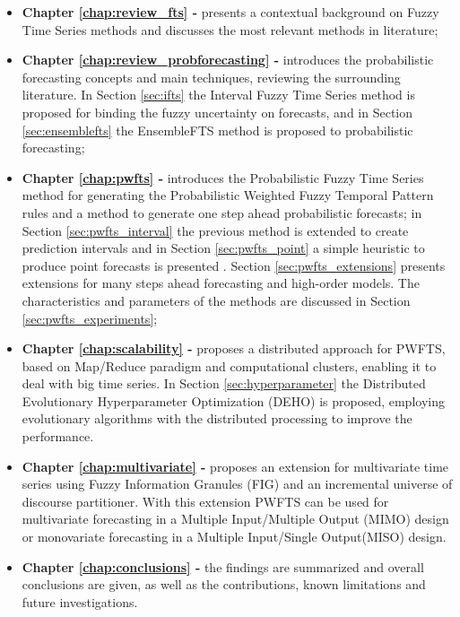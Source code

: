\begin{itemize}
\item \textbf{Chapter \ref{chap:review_fts} -  } presents a contextual background on Fuzzy Time Series methods and discusses the most relevant methods in literature;

\item \textbf{Chapter \ref{chap:review_probforecasting} -  } introduces the probabilistic forecasting concepts and main techniques, reviewing the surrounding literature. In Section \ref{sec:ifts} the Interval Fuzzy Time Series method is proposed for binding the fuzzy uncertainty on forecasts, and in Section \ref{sec:ensemblefts} the EnsembleFTS method is proposed to probabilistic forecasting;

\item \textbf{Chapter \ref{chap:pwfts} - } introduces the Probabilistic Fuzzy Time Series method for generating the Probabilistic Weighted Fuzzy Temporal Pattern rules and a method to generate one step ahead probabilistic forecasts; in Section \ref{sec:pwfts_interval} the previous method is extended to create prediction intervals and in Section \ref{sec:pwfts_point} a simple heuristic to produce point forecasts is presented . Section \ref{sec:pwfts_extensions} presents extensions for many steps ahead forecasting and high-order models. The characteristics and parameters of the methods are discussed in Section \ref{sec:pwfts_experiments};

\item \textbf{Chapter \ref{chap:scalability} - } proposes a distributed approach for PWFTS, based on Map/Reduce paradigm and computational clusters, enabling it to deal with big time series. In Section \ref{sec:hyperparameter} the Distributed Evolutionary Hyperparameter Optimization (DEHO) is proposed, employing evolutionary algorithms with the distributed processing to improve the performance.

\item \textbf{Chapter \ref{chap:multivariate} - } proposes an extension for multivariate time series using Fuzzy Information Granules (FIG) and an incremental universe of discourse partitioner. With this extension PWFTS can be used for multivariate forecasting in a Multiple Input/Multiple Output (MIMO) design or monovariate forecasting in a Multiple Input/Single Output(MISO) design.


\item \textbf{Chapter \ref{chap:conclusions} - } the findings are summarized and overall conclusions are given, as well as the contributions, known limitations and future investigations. 
\end{itemize}

